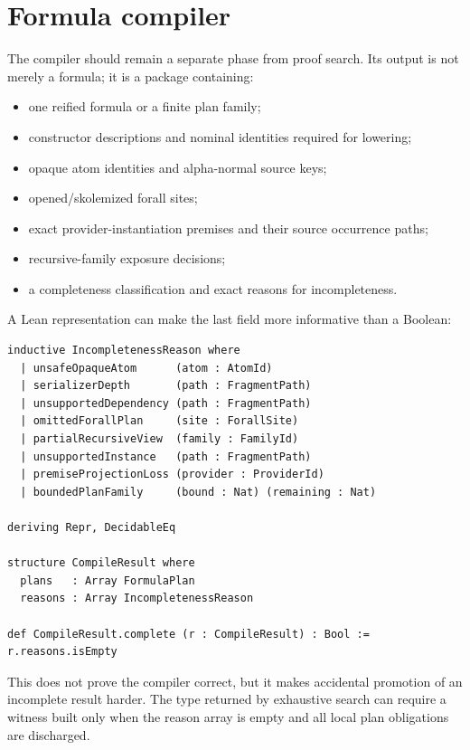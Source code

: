 \documentclass[10pt,letterpaper,oneside]{report}
\newcommand{\code}[1]{\texttt{\detokenize{#1}}}
\begin{document}
\section{Formula compiler}

The compiler should remain a separate phase from proof search. Its output is not merely a formula; it is a package containing:

\begin{itemize}
  \item one reified formula or a finite plan family;
  \item constructor descriptions and nominal identities required for lowering;
  \item opaque atom identities and alpha-normal source keys;
  \item opened/skolemized forall sites;
  \item exact provider-instantiation premises and their source occurrence paths;
  \item recursive-family exposure decisions;
  \item a completeness classification and exact reasons for incompleteness.
\end{itemize}

A Lean representation can make the last field more informative than a Boolean:

\begin{lstlisting}[language=Leanish]
inductive IncompletenessReason where
  | unsafeOpaqueAtom      (atom : AtomId)
  | serializerDepth       (path : FragmentPath)
  | unsupportedDependency (path : FragmentPath)
  | omittedForallPlan     (site : ForallSite)
  | partialRecursiveView  (family : FamilyId)
  | unsupportedInstance   (path : FragmentPath)
  | premiseProjectionLoss (provider : ProviderId)
  | boundedPlanFamily     (bound : Nat) (remaining : Nat)

deriving Repr, DecidableEq

structure CompileResult where
  plans   : Array FormulaPlan
  reasons : Array IncompletenessReason

def CompileResult.complete (r : CompileResult) : Bool := r.reasons.isEmpty
\end{lstlisting}

This does not prove the compiler correct, but it makes accidental promotion of an incomplete result harder. The type returned by exhaustive search can require a \code{CompleteCompilation} witness built only when the reason array is empty and all local plan obligations are discharged.
\end{document}

